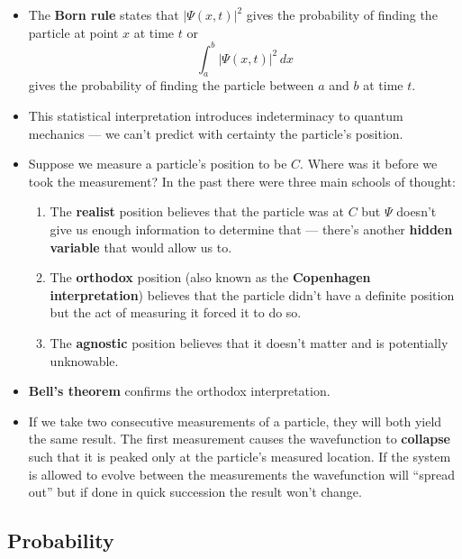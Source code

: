 \documentclass{article}
\begin{document}
\begin{itemize}
  \item The \textbf{Born rule} states that $|\Psi(x, t)|^2$ gives the probability of finding the particle at point $x$ at time $t$ or \[\int_a^b |\Psi(x, t)|^2 \,d x\] gives the probability of finding the particle between $a$ and $b$ at time $t$.

  \item This statistical interpretation introduces indeterminacy to quantum mechanics — we can't predict with certainty the particle's position.

  \item Suppose we measure a particle's position to be $C$. Where was it before we took the measurement? In the past there were three main schools of thought:

        \begin{enumerate}
          \item The \textbf{realist} position believes that the particle was at $C$ but $\Psi$ doesn't give us enough information to determine that — there's another \textbf{hidden variable} that would allow us to.

          \item The \textbf{orthodox} position (also known as the \textbf{Copenhagen interpretation}) believes that the particle didn't have a definite position but the act of measuring it forced it to do so.

          \item The \textbf{agnostic} position believes that it doesn't matter and is potentially unknowable.
        \end{enumerate}

  \item \textbf{Bell's theorem} confirms the orthodox interpretation.

  \item If we take two consecutive measurements of a particle, they will both yield the same result. The first measurement causes the wavefunction to \textbf{collapse} such that it is peaked only at the particle's measured location. If the system is allowed to evolve between the measurements the wavefunction will ``spread out'' but if done in quick succession the result won't change.
\end{itemize}

\subsection{Probability}
\end{document}
